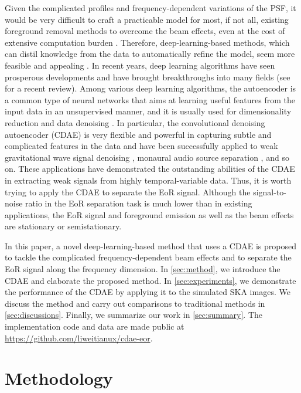 \documentclass[fleqn,usenatbib]{mnras}
\begin{document}
Given the complicated profiles and frequency-dependent variations of
the PSF, it would be very difficult to craft a practicable model for most,
if not all, existing foreground removal methods to overcome the beam
effects, even at the cost of extensive computation burden
\citep[e.g.,][]{lochner2015}.
Therefore, deep-learning-based methods, which can distil knowledge from
the data to automatically refine the model, seem more feasible
and appealing \citep[e.g.,][]{herbel2018,vafaeiSadr2019}.
In recent years, deep learning algorithms have seen prosperous
developments and have brought breakthroughs into many fields
(see \citealt{lecun2015} for a recent review).
Among various deep learning algorithms, the autoencoder is a common type of
neural networks that aims at learning useful features from the input data
in an unsupervised manner, and it is usually used for dimensionality
reduction \citep[e.g.,][]{hinton2006,wang2014} and data denoising
\citep[e.g.,][]{xie2012,bengio2013,lu2013}.
In particular,
the convolutional denoising autoencoder (CDAE) is very flexible and
powerful in capturing subtle and complicated features in the data and have
been successfully applied to weak gravitational wave signal denoising
\citep[e.g.,][]{shen2017}, monaural audio source separation
\citep[e.g.,][]{grais2017}, and so on.
These applications have demonstrated the outstanding abilities of the
CDAE in extracting weak signals from highly temporal-variable data.
Thus, it is worth trying to apply the CDAE to separate the EoR signal.
Although the signal-to-noise ratio in the EoR separation task is much lower
than in existing applications, the EoR signal and foreground emission as
well as the beam effects are stationary or semistationary.

In this paper, a novel deep-learning-based method that uses a CDAE
is proposed to tackle the complicated frequency-dependent beam effects
and to separate the EoR signal along the frequency dimension.
In \autoref{sec:method}, we introduce the CDAE and elaborate
the proposed method.
In \autoref{sec:experiments}, we demonstrate the performance of the
CDAE by applying it to the simulated SKA images.
We discuss the method and carry out
comparisons to traditional methods
in \autoref{sec:discussions}.
Finally, we summarize our work in \autoref{sec:summary}.
The implementation code and data are made public at
\url{https://github.com/liweitianux/cdae-eor}.


\section{Methodology}
\label{sec:method}
\end{document}
